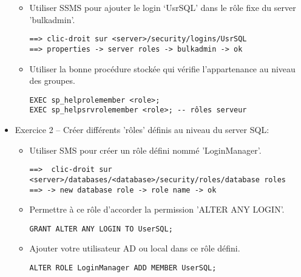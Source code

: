 \documentclass[a4paper]{article}
\begin{document}
\begin{itemize}
\begin{itemize}
\item Utiliser SSMS pour ajouter le login ‘UsrSQL’ dans le rôle fixe du server 'bulkadmin'.
\begin{example} \begin{verbatim}
==> clic-droit sur <server>/security/logins/UsrSQL
==> properties -> server roles -> bulkadmin -> ok
\end{verbatim} \end{example}

\item Utiliser la bonne procédure stockée qui vérifie l'appartenance au niveau des groupes.
\begin{example} \begin{verbatim}
EXEC sp_helprolemember <role>;
EXEC sp_helpsrvrolemember <role>; -- rôles serveur
\end{verbatim} \end{example}

\end{itemize}



\item Exercice 2 -- Créer différents 'rôles' définis au niveau du server SQL:
\begin{itemize}

\item Utiliser SMS pour créer un rôle défini nommé 'LoginManager'.
\begin{example} \begin{verbatim}
==>  clic-droit sur <server>/databases/<database>/security/roles/database roles
==> -> new database role -> role name -> ok
\end{verbatim} \end{example}

\item Permettre à ce rôle d'accorder la permission 'ALTER ANY LOGIN'.
\begin{example} \begin{verbatim}
GRANT ALTER ANY LOGIN TO UserSQL;
\end{verbatim} \end{example}

\item Ajouter votre utilisateur AD ou local dans ce rôle défini.
\begin{example} \begin{verbatim}
ALTER ROLE LoginManager ADD MEMBER UserSQL;
\end{verbatim} \end{example}


\end{itemize}
\end{itemize}
\end{document}
